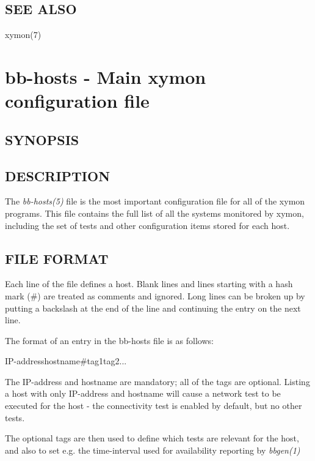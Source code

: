  
\subsection{SEE ALSO}
xymon(7) 

%
\section{bb-hosts - Main xymon configuration file}
 
\subsection{SYNOPSIS}
\begin{description}
\item[]


\end{description}
\subsection{DESCRIPTION}
 The \emph{bb-hosts(5)}
 file is the most important configuration file for all of the xymon
 programs. This file contains the full list of all the systems
 monitored by xymon, including the set of tests and other
 configuration items stored for each host. 
 
\subsection{FILE FORMAT}
 Each line of the file defines a host. Blank lines and lines starting
 with a hash mark (\#) are treated as comments and ignored. Long lines
 can be broken up by putting a backslash at the end of the line and
 continuing the entry on the next line. 


  The format of an entry in the bb-hosts file is as follows:  
 
IP-addresshostname\#tag1tag2... 


  The IP-address and hostname are mandatory; all of the tags are
  optional. Listing a host with only IP-address and hostname will
  cause a network test to be executed for the host - the connectivity
  test is enabled by default, but no other tests. 



  The optional tags are then used to define which tests are relevant
  for the host, and also to set e.g. the time-interval used for
  availability reporting by \emph{bbgen(1)}




